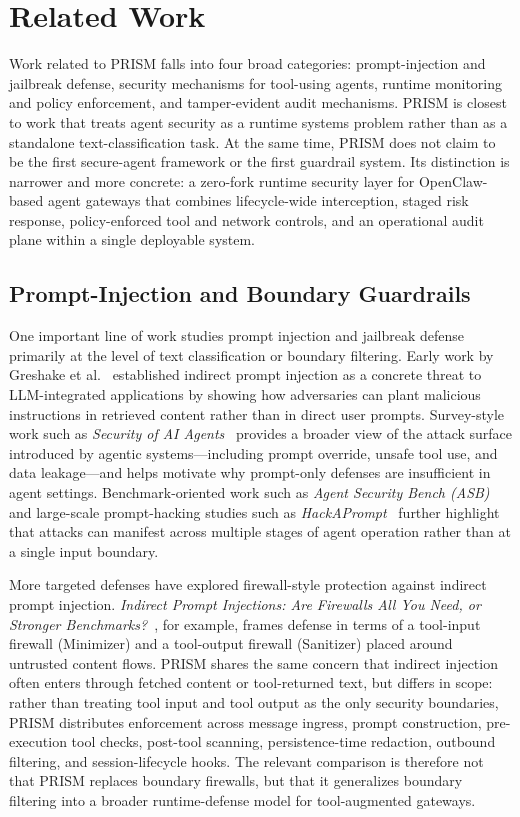\section{Related Work}

Work related to PRISM falls into four broad categories: prompt-injection and jailbreak defense, security mechanisms for tool-using agents, runtime monitoring and policy enforcement, and tamper-evident audit mechanisms. PRISM is closest to work that treats agent security as a runtime systems problem rather than as a standalone text-classification task. At the same time, PRISM does not claim to be the first secure-agent framework or the first guardrail system. Its distinction is narrower and more concrete: a zero-fork runtime security layer for OpenClaw-based agent gateways that combines lifecycle-wide interception, staged risk response, policy-enforced tool and network controls, and an operational audit plane within a single deployable system.

\subsection{Prompt-Injection and Boundary Guardrails}

One important line of work studies prompt injection and jailbreak defense primarily at the level of text classification or boundary filtering. Early work by Greshake et al.~\cite{greshake2023} established indirect prompt injection as a concrete threat to LLM-integrated applications by showing how adversaries can plant malicious instructions in retrieved content rather than in direct user prompts. Survey-style work such as \emph{Security of AI Agents}~\cite{securityofaiagents2024} provides a broader view of the attack surface introduced by agentic systems---including prompt override, unsafe tool use, and data leakage---and helps motivate why prompt-only defenses are insufficient in agent settings. Benchmark-oriented work such as \emph{Agent Security Bench (ASB)}~\cite{asb2024} and large-scale prompt-hacking studies such as \emph{HackAPrompt}~\cite{hackaprompt2023} further highlight that attacks can manifest across multiple stages of agent operation rather than at a single input boundary.

More targeted defenses have explored firewall-style protection against indirect prompt injection. \emph{Indirect Prompt Injections: Are Firewalls All You Need, or Stronger Benchmarks?}~\cite{indirectpromptfirewalls2025}, for example, frames defense in terms of a tool-input firewall (Minimizer) and a tool-output firewall (Sanitizer) placed around untrusted content flows. PRISM shares the same concern that indirect injection often enters through fetched content or tool-returned text, but differs in scope: rather than treating tool input and tool output as the only security boundaries, PRISM distributes enforcement across message ingress, prompt construction, pre-execution tool checks, post-tool scanning, persistence-time redaction, outbound filtering, and session-lifecycle hooks. The relevant comparison is therefore not that PRISM replaces boundary firewalls, but that it generalizes boundary filtering into a broader runtime-defense model for tool-augmented gateways.


